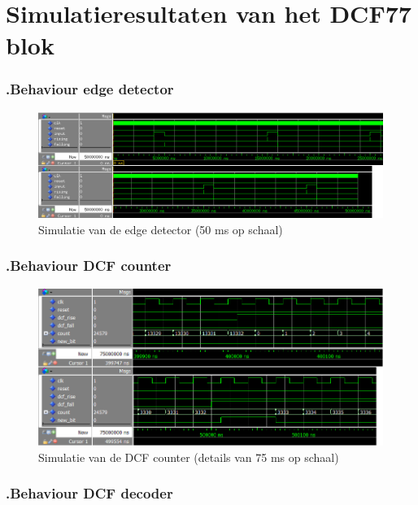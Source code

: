 \chapter[Simulatie resultaten DCF]{Simulatieresultaten van het DCF77 blok}
\label{Ap: dcf_sim}
\subsection*{\label{fig: edge_beh}\thesubsection.\quad Behaviour edge detector}
\begin{figure}[ht!]
\includegraphics[width=\textwidth,height=\textheight,keepaspectratio]{Figuren/DCF77/Edge_detector.png}
\caption{Simulatie van de edge detector (50 ms op schaal)}
\end{figure}
\subsection*{\label{fig: count_beh}\thesubsection.\quad Behaviour DCF counter}
\begin{figure}[ht!]
\includegraphics[width=\textwidth,height=\textheight,keepaspectratio]{Figuren/DCF77/Counter.png}
\caption{Simulatie van de DCF counter (details van 75 ms op schaal)}
\end{figure}
\subsection*{\label{fig: decoder_beh}\thesubsection.\quad Behaviour DCF decoder}
